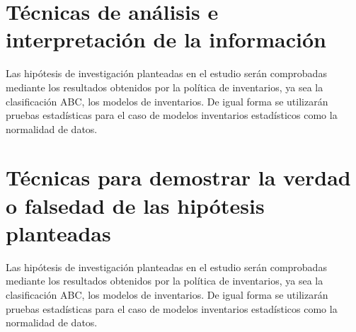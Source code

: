 \section{Técnicas de análisis e interpretación de la información}

Las hipótesis de investigación planteadas en el estudio serán comprobadas mediante los resultados obtenidos por la política de inventarios, ya sea la clasificación ABC, los modelos de inventarios. De igual forma se utilizarán pruebas estadísticas para el caso de modelos inventarios estadísticos como la normalidad de datos.

\section{Técnicas para demostrar la verdad o falsedad de las hipótesis planteadas}

Las hipótesis de investigación planteadas en el estudio serán comprobadas mediante los resultados obtenidos por la política de inventarios, ya sea la clasificación ABC, los modelos de inventarios. De igual forma se utilizarán pruebas estadísticas para el caso de modelos inventarios estadísticos como la normalidad de datos.